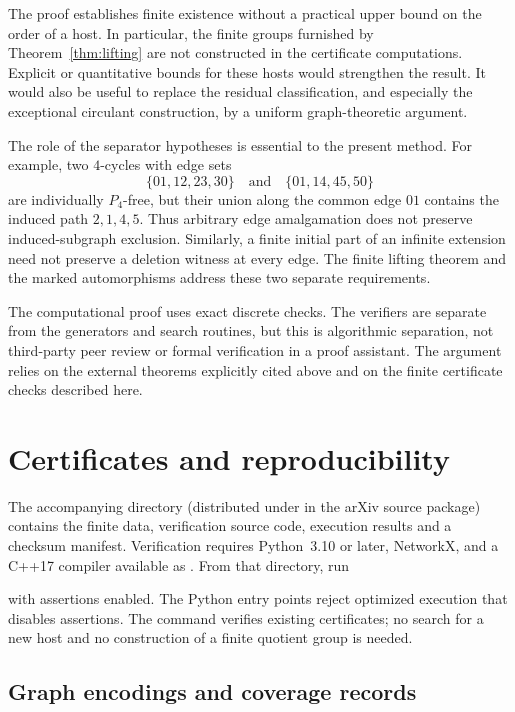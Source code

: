 \documentclass[11pt,reqno]{amsart}
\theoremstyle{definition}
\theoremstyle{remark}
\newcommand{\file}[1]{\texttt{\detokenize{#1}}}
\begin{document}
The proof establishes finite existence without a practical upper bound on the order of a host. In particular, the finite groups furnished by Theorem~\ref{thm:lifting} are not constructed in the certificate computations. Explicit or quantitative bounds for these hosts would strengthen the result. It would also be useful to replace the residual classification, and especially the exceptional circulant construction, by a uniform graph-theoretic argument.

The role of the separator hypotheses is essential to the present method. For example, two $4$-cycles with edge sets
\[
 \{01,12,23,30\}\quad\text{and}\quad\{01,14,45,50\}
\]
are individually $P_4$-free, but their union along the common edge $01$ contains the induced path $2,1,4,5$. Thus arbitrary edge amalgamation does not preserve induced-subgraph exclusion. Similarly, a finite initial part of an infinite extension need not preserve a deletion witness at every edge. The finite lifting theorem and the marked automorphisms address these two separate requirements.

The computational proof uses exact discrete checks. The verifiers are separate from the generators and search routines, but this is algorithmic separation, not third-party peer review or formal verification in a proof assistant. The argument relies on the external theorems explicitly cited above and on the finite certificate checks described here.

\appendix
\section{Certificates and reproducibility}\label{app:repro}

The accompanying directory \file{certificates/} (distributed under \file{anc/} in the arXiv source package) contains the finite data, verification source code, execution results and a checksum manifest. Verification requires Python~3.10 or later, NetworkX, and a C++17 compiler available as \file{g++}. From that directory, run
\begin{quote}
\file{python3 run_all.py}
\end{quote}
with assertions enabled. The Python entry points reject optimized execution that disables assertions. The command verifies existing certificates; no search for a new host and no construction of a finite quotient group is needed.

\subsection{Graph encodings and coverage records}
\end{document}
